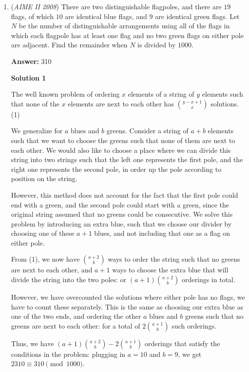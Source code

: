\begin{enumerate}
	\item (\textit{AIME II 2008}) There are two distinguishable flagpoles, and there are $19$ flags, of which $10$ are identical blue flags, and $9$ are identical green flags. Let $N$ be the number of distinguishable arrangements using all of the flags in which each flagpole has at least one flag and no two green flags on either pole are adjacent. Find the remainder when $N$ is divided by $1000$.


 
 \textbf{Answer: }310



\textbf{Solution 1}

The well known problem of ordering $x$ elements of a string of $y$ elements such that none of the $x$ elements are next to each other has ${y-x+1\choose x}$ solutions. (1)

 We generalize for $a$ blues and $b$ greens. Consider a string of $a+b$ elements such that we want to choose the greens such that none of them are next to each other. We would also like to choose a place where we can divide this string into two strings such that the left one represents the first pole, and the right one represents the second pole, in order up the pole according to position on the string. 

 However, this method does not account for the fact that the first pole could end with a green, and the second pole could start with a green, since the original string assumed that no greens could be consecutive. We solve this problem by introducing an extra blue, such that we choose our divider by choosing one of these $a+1$ blues, and not including that one as a flag on either pole.

 From (1), we now have ${a+2\choose b}$ ways to order the string such that no greens are next to each other, and $a+1$ ways to choose the extra blue that will divide the string into the two poles: or $(a+1){a+2\choose b}$ orderings in total.

 However, we have overcounted the solutions where either pole has no flags, we have to count these separately. This is the same as choosing our extra blue as one of the two ends, and ordering the other $a$ blues and $b$ greens such that no greens are next to each other: for a total of $2{a+1\choose b}$ such orderings.

 Thus, we have $(a+1){a+2\choose b}-2{a+1\choose b}$ orderings that satisfy the conditions in the problem: plugging in $a=10$ and $b=9$, we get $2310 \equiv \boxed{310} \pmod{1000}$.


\end{enumerate}
